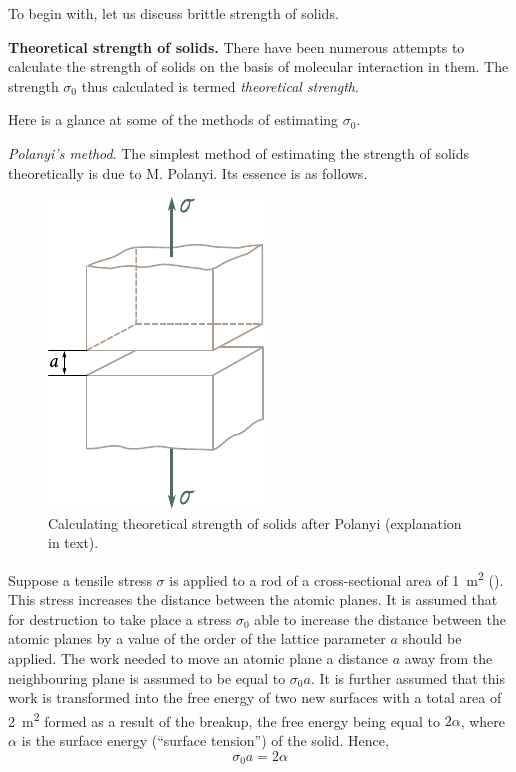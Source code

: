 To begin with, let us discuss brittle strength of solids.

\textbf{Theoretical strength of solids.} There have been numerous attempts to calculate the strength of solids on the basis of molecular
interaction in them. The strength $\sigma_0$ thus calculated is termed
\textit{theoretical strength}.

Here is a glance at some of the methods of estimating $\sigma_0$.

\textit{Polanyi's method}. The simplest method of estimating the strength of solids theoretically is due to M. Polanyi. Its essence is as follows.

\begin{figure}[t]
	\begin{center}
		\includegraphics[scale=1.0]{figures/ch_02/fig_2_25.pdf}
		\caption[]{Calculating theoretical strength of solids after Polanyi (explanation in text).}
		\label{fig:2_25}
	\end{center}
	\vspace{-0.7cm}
\end{figure}

Suppose a tensile stress $\sigma$ is applied to a rod of a cross-sectional area of \SI{1}{\metre\squared} (). This stress increases the distance between the atomic planes. It is assumed that for destruction to take place a stress $\sigma_0$ able to increase the distance between the atomic planes by a value of the order of the lattice parameter $a$ should be applied. The work needed to move an atomic plane a distance $a$ away from the neighbouring plane is assumed to be equal to $\sigma_0 a$. It is further assumed that this work is transformed into the free energy of two new surfaces with a total area of \SI{2}{\metre\squared} formed as a result of the breakup, the free energy being equal to $2\alpha$, where $\alpha$ is the surface energy (``surface tension'') of the solid. Hence,
\begin{equation*}
	\sigma_0 a = 2 \alpha
\end{equation*}

